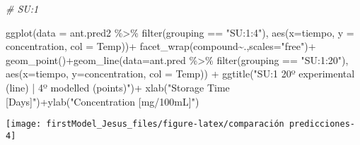 \documentclass[
]{article}
\newenvironment{Shaded}{\begin{snugshade}}{\end{snugshade}}
\newcommand{\AttributeTok}[1]{\textcolor[rgb]{0.77,0.63,0.00}{#1}}
\newcommand{\CommentTok}[1]{\textcolor[rgb]{0.56,0.35,0.01}{\textit{#1}}}
\newcommand{\FunctionTok}[1]{\textcolor[rgb]{0.00,0.00,0.00}{#1}}
\newcommand{\NormalTok}[1]{#1}
\newcommand{\SpecialCharTok}[1]{\textcolor[rgb]{0.00,0.00,0.00}{#1}}
\newcommand{\StringTok}[1]{\textcolor[rgb]{0.31,0.60,0.02}{#1}}
\begin{document}
\begin{Shaded}
\begin{Highlighting}[]
\CommentTok{\# SU:1}

\FunctionTok{ggplot}\NormalTok{(}\AttributeTok{data =}\NormalTok{ ant.pred2 }\SpecialCharTok{\%\textgreater{}\%} \FunctionTok{filter}\NormalTok{(grouping }\SpecialCharTok{==} \StringTok{"SU:1:4"}\NormalTok{), }\FunctionTok{aes}\NormalTok{(}\AttributeTok{x=}\NormalTok{tiempo, }\AttributeTok{y =}\NormalTok{ concentration, }\AttributeTok{col =}\NormalTok{ Temp))}\SpecialCharTok{+}
  \FunctionTok{facet\_wrap}\NormalTok{(compound}\SpecialCharTok{\textasciitilde{}}\NormalTok{.,}\AttributeTok{scales=}\StringTok{"free"}\NormalTok{)}\SpecialCharTok{+}
  \FunctionTok{geom\_point}\NormalTok{()}\SpecialCharTok{+}\FunctionTok{geom\_line}\NormalTok{(}\AttributeTok{data=}\NormalTok{ant.pred }\SpecialCharTok{\%\textgreater{}\%} \FunctionTok{filter}\NormalTok{(grouping }\SpecialCharTok{==} \StringTok{"SU:1:20"}\NormalTok{), }\FunctionTok{aes}\NormalTok{(}\AttributeTok{x=}\NormalTok{tiempo, }\AttributeTok{y=}\NormalTok{concentration, }\AttributeTok{col =}\NormalTok{ Temp)) }\SpecialCharTok{+}
  \FunctionTok{ggtitle}\NormalTok{(}\StringTok{"SU:1 20º experimental (line) | 4º modelled (points)"}\NormalTok{)}\SpecialCharTok{+} \FunctionTok{xlab}\NormalTok{(}\StringTok{"Storage Time [Days]"}\NormalTok{)}\SpecialCharTok{+}\FunctionTok{ylab}\NormalTok{(}\StringTok{"Concentration [mg/100mL]"}\NormalTok{)}
\end{Highlighting}
\end{Shaded}

\begin{center}\texttt{[image: firstModel\_Jesus\_files/figure-latex/comparación predicciones-4]} \end{center}
\end{document}
